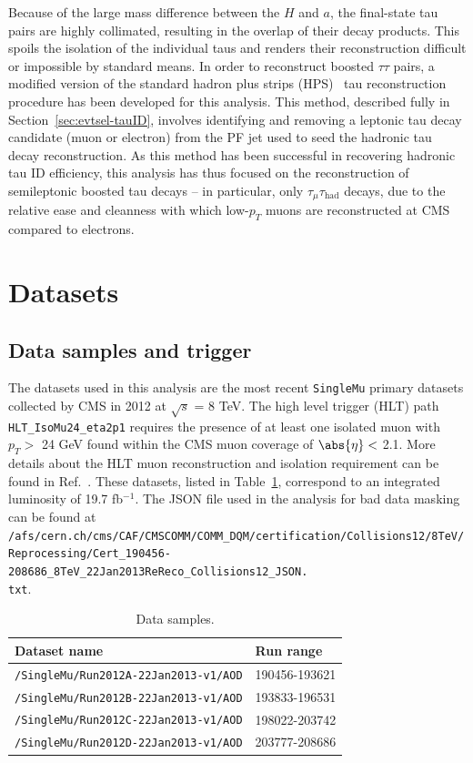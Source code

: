 Because of the large mass difference between the $H$ and $a$, the final-state tau pairs are highly collimated, resulting in the overlap of their decay products. This spoils the isolation of the individual taus and renders their reconstruction difficult or impossible by standard means. In order to reconstruct boosted $\tau\tau$ pairs, a modified version of the standard hadron plus strips (HPS)~\cite{CMS:2011msa} tau reconstruction procedure has been developed for this analysis. This method, described fully in Section~\ref{sec:evtsel-tauID}, involves identifying and removing a leptonic tau decay candidate (muon or electron) from the PF jet used to seed the hadronic tau decay reconstruction. As this method has been successful in recovering hadronic tau ID efficiency, this analysis has thus focused on the reconstruction of semileptonic boosted tau decays -- in particular, only $\tau_{\mu}\tau_{\text{had}}$ decays, due to the relative ease and cleanness with which low-$p_T$ muons are reconstructed at CMS compared to electrons.

\section{Datasets\label{sec:datasets}}

\subsection{Data samples and trigger\label{sec:datasets-data}}
The datasets used in this analysis are the most recent \texttt{SingleMu} primary datasets collected by CMS in 2012 at $\sqrt{s}$ = 8 TeV.  The high level trigger (HLT) path \texttt{HLT\_IsoMu24\_eta2p1} requires the presence of at least one isolated muon with $p_T >$ 24 GeV found within the CMS muon coverage of $\abs{\eta} <$ 2.1.  More details about the HLT muon reconstruction and isolation requirement can be found in Ref.~\cite{HLTMenus}.  These datasets, listed in Table~\ref{tab:Data}, correspond to an integrated luminosity of 19.7 fb$^{-1}$. The JSON file used in the analysis for bad data masking can be found at \texttt{/afs/cern.ch/cms/CAF/CMSCOMM/COMM\_DQM/certification/Collisions12/8TeV/\\Reprocessing/Cert\_190456-208686\_8TeV\_22Jan2013ReReco\_Collisions12\_JSON.\\txt}.

\begin{table}
\begin{center}
\begin{tabular}{ll}
	\hline
	Dataset name & Run range \\
	\hline
	\texttt{/SingleMu/Run2012A-22Jan2013-v1/AOD} & 190456-193621 \\
	\texttt{/SingleMu/Run2012B-22Jan2013-v1/AOD} & 193833-196531 \\
	\texttt{/SingleMu/Run2012C-22Jan2013-v1/AOD} & 198022-203742 \\
	\texttt{/SingleMu/Run2012D-22Jan2013-v1/AOD} & 203777-208686 \\
	\hline
\end{tabular}
\caption{Data samples.}
\label{tab:Data}
\end{center}
\end{table}

